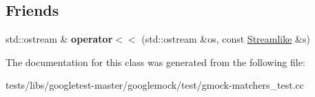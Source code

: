 \subsection*{Friends}
\begin{DoxyCompactItemize}
\item 
\mbox{\label{classtesting_1_1gmock__matchers__test_1_1Streamlike_a4b45ba8c2a5ee61697003f02568df91f}} 
std\+::ostream \& {\bfseries operator$<$$<$} (std\+::ostream \&os, const \hyperlink{classtesting_1_1gmock__matchers__test_1_1Streamlike}{Streamlike} \&s)
\end{DoxyCompactItemize}


The documentation for this class was generated from the following file\+:\begin{DoxyCompactItemize}
\item 
tests/libs/googletest-\/master/googlemock/test/gmock-\/matchers\+\_\+test.\+cc\end{DoxyCompactItemize}
